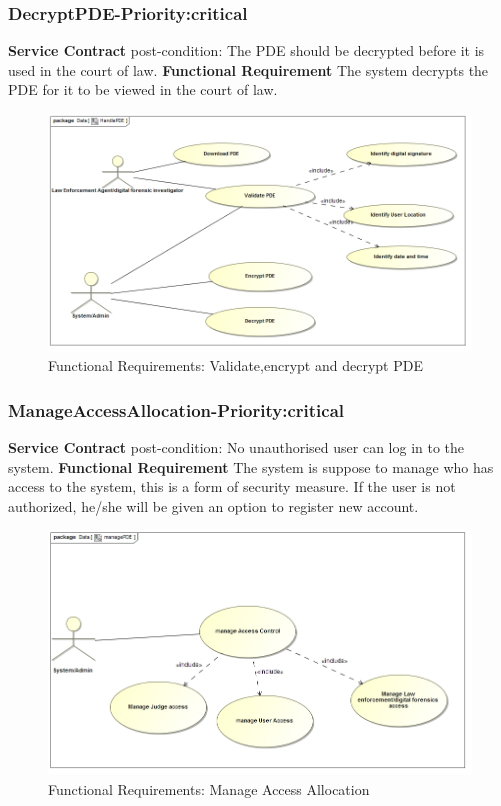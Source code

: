 \documentclass[a4paper,12pt]{article}
\begin{document}
\subsubsection{DecryptPDE-Priority:critical}
\textbf{Service Contract}\newline
post-condition: The PDE should be decrypted before it is used in the court of law.\newline
\textbf{Functional Requirement}\newline
The system decrypts the PDE for it to be viewed in the court of law.\newline
\begin{figure}[H]
\includegraphics[width=\textwidth]{images/HandlePDE.jpg}
\caption{Functional Requirements: Validate,encrypt and decrypt PDE\label{overflow}}
\end{figure}
\subsubsection{ManageAccessAllocation-Priority:critical}
\textbf{Service Contract}\newline
post-condition: No unauthorised user can log in to the system.\newline
\textbf{Functional Requirement}\newline
The system is suppose to manage who has access to the system, this is a form of security measure. If the user is not authorized, he/she will be given an option to register new account.\newline
\begin{figure}[H]
\includegraphics[width=\textwidth]{images/managePDE.jpg}
\caption{Functional Requirements: Manage Access Allocation\label{overflow}}
\end{figure}
\end{document}
